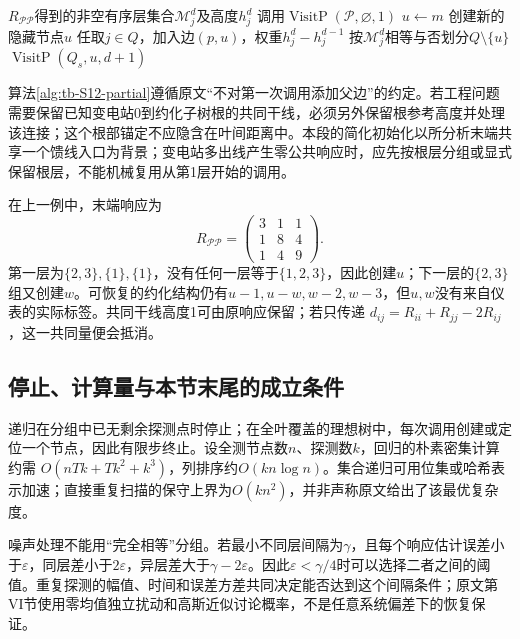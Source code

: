 \documentclass[UTF8,11pt,fontset=fandol,openany,oneside]{ctexbook}
\theoremstyle{definition}
\theoremstyle{remark}
\numberwithin{equation}{chapter}
\begin{document}
\begin{algorithm}[htbp]
\caption{S12部分测压递归：原文Algorithm 2的统一记号重述}
\label{alg:tb-S12-partial}
\begin{algorithmic}[1]
\Require $R_{\mathcal P\mathcal P}$得到的非空有序层集合$\mathcal M_j^d$及高度$h_j^d$
\State 调用$\operatorname{VisitP}(\mathcal P,\varnothing,1)$
  \State $u\gets m$
 \Else
  \State 创建新的隐藏节点$u$
 \EndIf
  \State 任取$j\in Q$，加入边$(p,u)$，权重$h_j^d-h_j^{d-1}$
 \EndIf
 \State 按$\mathcal M_j^d$相等与否划分$Q\setminus\{u\}$
  \State $\operatorname{VisitP}(Q_s,u,d+1)$
 \EndFor
\EndFunction
\end{algorithmic}
\end{algorithm}
算法\ref{alg:tb-S12-partial}遵循原文“不对第一次调用添加父边”的约定。若工程问题需要保留已知变电站0到约化子树根的共同干线，必须另外保留根参考高度并处理该连接；这个根部锚定不应隐含在叶间距离中。本段的简化初始化以所分析末端共享一个馈线入口为背景；变电站多出线产生零公共响应时，应先按根层分组或显式保留根层，不能机械复用从第1层开始的调用。

在上一例中，末端响应为
\[
 R_{\mathcal P\mathcal P}=
 \begin{pmatrix}3&1&1\\1&8&4\\1&4&9\end{pmatrix}.
\]
第一层为$\{2,3\},\{1\},\{1\}$，没有任何一层等于$\{1,2,3\}$，因此创建$u$；下一层的$\{2,3\}$组又创建$w$。可恢复的约化结构仍有$u-1,u-w,w-2,w-3$，但$u,w$没有来自仪表的实际标签。共同干线高度1可由原响应保留；若只传递
$d_{ij}=R_{ii}+R_{jj}-2R_{ij}$，这一共同量便会抵消。

\subsection{停止、计算量与本节末尾的成立条件}

递归在分组中已无剩余探测点时停止；在全叶覆盖的理想树中，每次调用创建或定位一个节点，因此有限步终止。设全测节点数$n$、探测数$k$，回归的朴素密集计算约需
$O(nTk+Tk^2+k^3)$，列排序约$O(kn\log n)$。集合递归可用位集或哈希表示加速；直接重复扫描的保守上界为$O(kn^2)$，并非声称原文给出了该最优复杂度。

噪声处理不能用“完全相等”分组。若最小不同层间隔为$\gamma$，且每个响应估计误差小于$\varepsilon$，同层差小于$2\varepsilon$，异层差大于$\gamma-2\varepsilon$。因此$\varepsilon<\gamma/4$时可以选择二者之间的阈值。重复探测的幅值、时间和误差方差共同决定能否达到这个间隔条件；原文第VI节使用零均值独立扰动和高斯近似讨论概率，不是任意系统偏差下的恢复保证。
\end{document}
